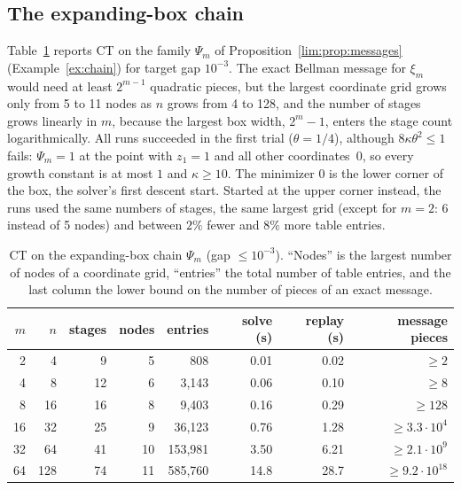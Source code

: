 \subsection{The expanding-box chain}\label{sec:comp-chain}
Table~\ref{tab:chain} reports CT on the family $\Psi_m$ of
Proposition~\ref{lim:prop:messages} (Example~\ref{ex:chain}) for target gap
$10^{-3}$. The exact Bellman message for $\xi_m$ would need at least
$2^{m-1}$ quadratic pieces, but the largest coordinate grid grows only from 5
to 11 nodes as $n$ grows from 4 to 128, and the number of stages grows
linearly in $m$, because the largest box width, $2^m-1$, enters the stage
count logarithmically. All runs succeeded in the first trial ($\theta=1/4$),
although $8\kappa\theta^2\le1$ fails: $\Psi_m=1$ at the point with $z_1=1$ and
all other coordinates~$0$, so every growth constant is at most $1$ and
$\kappa\ge10$. The minimizer $0$ is the lower corner of the box, the solver's
first descent start. Started at the upper corner instead, the runs used the
same numbers of stages, the same largest grid (except for $m=2$: 6 instead of
5 nodes) and between $2\%$ fewer and $8\%$ more table entries.

\begin{table}[t]
\centering\small
\caption{CT on the expanding-box chain $\Psi_m$ (gap $\le10^{-3}$). ``Nodes'' is
the largest number of nodes of a coordinate grid, ``entries'' the total
number of table entries, and the last column the lower bound on the number of
pieces of an exact message.}\label{tab:chain}
\begin{tabular}{rrrrrrrr}
\toprule
$m$ & $n$ & stages & nodes & entries & solve (s) & replay (s) & message pieces\\
\midrule
2 & 4 & 9 & 5 & 808 & 0.01 & 0.02 & $\ge2$\\
4 & 8 & 12 & 6 & 3{,}143 & 0.06 & 0.10 & $\ge8$\\
8 & 16 & 16 & 8 & 9{,}403 & 0.16 & 0.29 & $\ge128$\\
16 & 32 & 25 & 9 & 36{,}123 & 0.76 & 1.28 & $\ge3.3\cdot10^4$\\
32 & 64 & 41 & 10 & 153{,}981 & 3.50 & 6.21 & $\ge2.1\cdot10^9$\\
64 & 128 & 74 & 11 & 585{,}760 & 14.8 & 28.7 & $\ge9.2\cdot10^{18}$\\
\bottomrule
\end{tabular}
\end{table}

